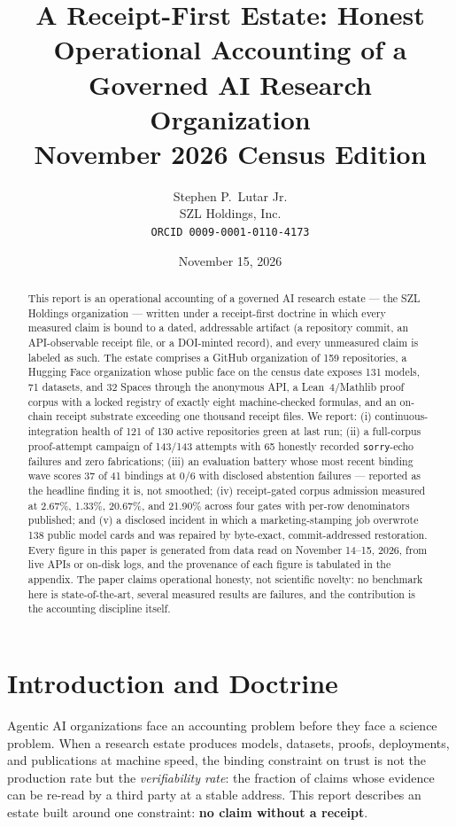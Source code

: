 ﻿\documentclass[11pt]{article}
\title{A Receipt-First Estate: Honest Operational Accounting of a Governed AI Research Organization\\ \large November 2026 Census Edition}
\author{Stephen P.\ Lutar Jr.\\ SZL Holdings, Inc.\\ \texttt{ORCID 0009-0001-0110-4173}}
\date{November 15, 2026}
\begin{document}
\maketitle

\begin{abstract}
This report is an operational accounting of a governed AI research estate --- the SZL Holdings organization --- written under a receipt-first doctrine in which every measured claim is bound to a dated, addressable artifact (a repository commit, an API-observable receipt file, or a DOI-minted record), and every unmeasured claim is labeled as such. The estate comprises a GitHub organization of 159 repositories, a Hugging Face organization whose public face on the census date exposes 131 models, 71 datasets, and 32 Spaces through the anonymous API, a Lean~4/Mathlib proof corpus with a locked registry of exactly eight machine-checked formulas, and an on-chain receipt substrate exceeding one thousand receipt files. We report: (i) continuous-integration health of 121 of 130 active repositories green at last run; (ii) a full-corpus proof-attempt campaign of 143/143 attempts with 65 honestly recorded \texttt{sorry}-echo failures and zero fabrications; (iii) an evaluation battery whose most recent binding wave scores 37 of 41 bindings at 0/6 with disclosed abstention failures --- reported as the headline finding it is, not smoothed; (iv) receipt-gated corpus admission measured at 2.67\%, 1.33\%, 20.67\%, and 21.90\% across four gates with per-row denominators published; and (v) a disclosed incident in which a marketing-stamping job overwrote 138 public model cards and was repaired by byte-exact, commit-addressed restoration. Every figure in this paper is generated from data read on November 14--15, 2026, from live APIs or on-disk logs, and the provenance of each figure is tabulated in the appendix. The paper claims operational honesty, not scientific novelty: no benchmark here is state-of-the-art, several measured results are failures, and the contribution is the accounting discipline itself.
\end{abstract}

\section{Introduction and Doctrine}
\label{sec:intro}

Agentic AI organizations face an accounting problem before they face a science problem. When a research estate produces models, datasets, proofs, deployments, and publications at machine speed, the binding constraint on trust is not the production rate but the \emph{verifiability rate}: the fraction of claims whose evidence can be re-read by a third party at a stable address. This report describes an estate built around one constraint: \textbf{no claim without a receipt}.
\end{document}
